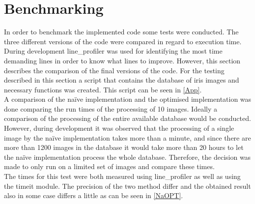 \section{Benchmarking}
In order to benchmark the implemented code some tests were conducted. The three different versions of the code were compared in regard to execution time. During development line_profiler was used for identifying the most time demanding lines in order to know what lines to improve. However, this section describes the comparison of the final versions of the code. For the testing described in this section a script that contains the database of iris images and necessary functions was created. This script can be seen in \autoref{App}. \\
A comparison of the na\"ive implementation and the optimised implementation was done comparing the run times of the processing of 10 images. Ideally a comparison of the processing of the entire available database would be conducted. However, during development it was observed that the processing of a single image by the na\"ive implementation takes more than a minute, and since there are more than 1200 images in the database it would take more than 20 hours to let the na\"ive implementation process the whole database. Therefore, the decision was made to only run on a limited set of images and compare these times. \\
The times for this test were both measured using line_profiler as well as using the timeit module. The precision of the two method differ and the obtained result also in some case differs a little as can be seen in \autoref{NaOPT}.  

